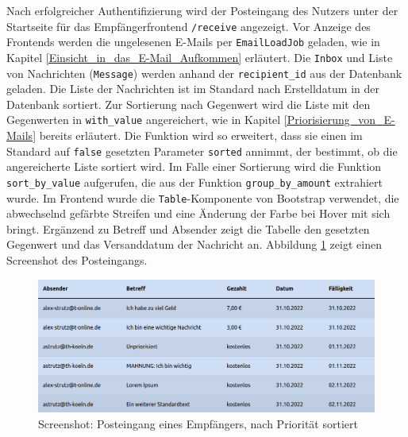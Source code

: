 \noindent Nach erfolgreicher Authentifizierung wird der Posteingang des Nutzers unter der Startseite für das Empfängerfrontend \texttt{/receive} angezeigt. Vor Anzeige des Frontends werden die ungelesenen E-Mails per \texttt{EmailLoadJob} geladen, wie in Kapitel \ref{Einsicht_in_das_E-Mail_Aufkommen} erläutert. Die \texttt{Inbox} und Liste von Nachrichten (\texttt{Message}) werden anhand der \texttt{recipient\_id} aus der Datenbank geladen. Die Liste der Nachrichten ist im Standard nach Erstelldatum in der Datenbank sortiert. Zur Sortierung nach Gegenwert wird die Liste mit den Gegenwerten in \texttt{with\_value} angereichert, wie in Kapitel \ref{Priorisierung_von_E-Mails} bereits erläutert. Die Funktion wird so erweitert, dass sie einen im Standard auf \texttt{false} gesetzten Parameter \texttt{sorted} annimmt, der bestimmt, ob die angereicherte Liste sortiert wird. Im Falle einer Sortierung wird die Funktion \texttt{sort\_by\_value} aufgerufen, die aus der Funktion \texttt{group\_by\_amount} extrahiert wurde. Im Frontend wurde die \texttt{Table}-Komponente von Bootstrap verwendet, die abwechselnd gefärbte Streifen und eine Änderung der Farbe bei Hover mit sich bringt. Ergänzend zu Betreff und Absender zeigt die Tabelle den gesetzten Gegenwert und das Versanddatum der Nachricht an. Abbildung \ref{fig:screenshot_inbox} zeigt einen Screenshot des Posteingangs.

\begin{figure}[!ht]
	\centering
		\includegraphics[width=1\textwidth]{Figures/inbox.png}
	\caption{Screenshot: Posteingang eines Empfängers, nach Priorität sortiert}
	\label{fig:screenshot_inbox}
\end{figure}

